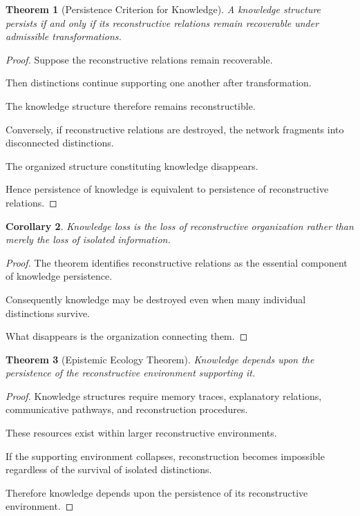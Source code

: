 \documentclass[12pt,oneside]{article}
\newtheorem{theorem}{Theorem}[section] \newtheorem{lemma}[theorem]{Lemma} \newtheorem{proposition}[theorem]{Proposition} \newtheorem{corollary}[theorem]{Corollary}
\theoremstyle{definition}
\begin{document}
\begin{theorem}[Persistence Criterion for Knowledge]

A knowledge structure persists if and only if its reconstructive relations remain recoverable under admissible transformations.

\end{theorem}

\begin{proof}

Suppose the reconstructive relations remain recoverable.

Then distinctions continue supporting one another after transformation.

The knowledge structure therefore remains reconstructible.

Conversely, if reconstructive relations are destroyed, the network fragments into disconnected distinctions.

The organized structure constituting knowledge disappears.

Hence persistence of knowledge is equivalent to persistence of reconstructive relations.

\end{proof}

\begin{corollary}

Knowledge loss is the loss of reconstructive organization rather than merely the loss of isolated information.

\end{corollary}

\begin{proof}

The theorem identifies reconstructive relations as the essential component of knowledge persistence.

Consequently knowledge may be destroyed even when many individual distinctions survive.

What disappears is the organization connecting them.

\end{proof}

\begin{theorem}[Epistemic Ecology Theorem]

Knowledge depends upon the persistence of the reconstructive environment supporting it.

\end{theorem}

\begin{proof}

Knowledge structures require memory traces, explanatory relations, communicative pathways, and reconstruction procedures.

These resources exist within larger reconstructive environments.

If the supporting environment collapses, reconstruction becomes impossible regardless of the survival of isolated distinctions.

Therefore knowledge depends upon the persistence of its reconstructive environment.

\end{proof}
\end{document}
